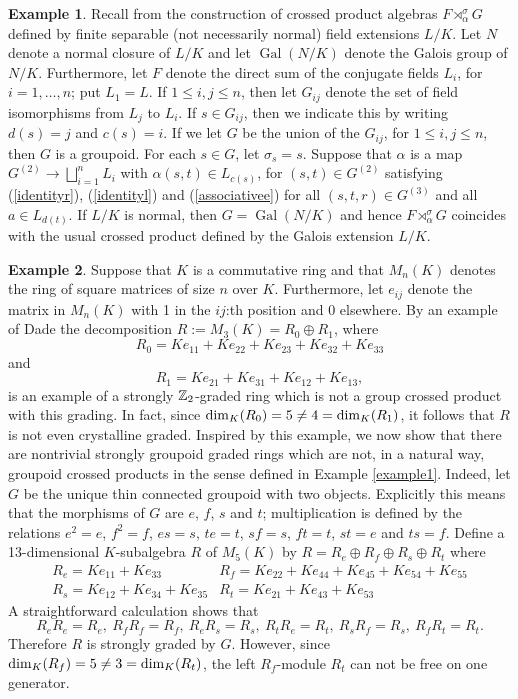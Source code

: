 \documentclass[11pt,leqno]{amsart}
\theoremstyle{plain}
\theoremstyle{definition}
\newtheorem{exmp}{Example}
\DeclareMathOperator{\Gal}{Gal}
\begin{document}
\begin{exmp}\label{example4}
Recall from \cite{lu05} the construction of
crossed product algebras $F \rtimes_{\alpha}^{\sigma} G$
defined by finite separable (not necessarily normal) field extensions $L/K$.
Let $N$ denote a normal closure of $L/K$ and
let $\Gal(N/K)$ denote the Galois group of $N/K$.
Furthermore, let $F$ denote the direct sum of the conjugate fields
$L_i$, for $i = 1, \ldots , n$; put $L_1 = L$.
If $1 \leq i,j \leq n$, then let $G_{ij}$ denote the set of
field isomorphisms from $L_j$ to $L_i$. If $s \in G_{ij}$,
then we indicate this by writing $d(s) = j$ and $c(s) = i$.
If we let $G$ be the union of the $G_{ij}$, for $1 \leq i,j \leq n$, then $G$ is a groupoid.
For each $s \in G$, let $\sigma_s = s$.
Suppose that $\alpha$ is a map
$G^{(2)} \rightarrow \bigsqcup_{i=1}^n L_i$
with $\alpha(s,t) \in L_{c(s)}$, for $(s,t) \in G^{(2)}$ satisfying
(\ref{identityr}), (\ref{identityl}) and (\ref{associativee})
for all $(s,t,r) \in G^{(3)}$ and all $a \in L_{d(t)}$.
If $L/K$ is normal, then $G = \Gal(N/K)$
and hence $F \rtimes_{\alpha}^{\sigma} G$
coincides with the usual crossed product
defined by the Galois extension $L/K$.
\end{exmp}

\begin{exmp}\label{example5}
Suppose that $K$ is a commutative ring and that $M_n(K)$
denotes the ring of square matrices of size $n$ over $K$.
Furthermore, let $e_{ij}$ denote
the matrix in $M_n(K)$ with 1 in the $ij$:th
position and 0 elsewhere.
By an example of Dade \cite{dade} the decomposition
$R := M_3(K) = R_0 \oplus R_1$, where
$$R_0 = Ke_{11} + Ke_{22} + Ke_{23} + Ke_{32} + Ke_{33}$$
and
$$R_1 =Ke_{21} + Ke_{31} + Ke_{12} + Ke_{13},$$
is an example of a strongly ${\Bbb Z}_2$-graded ring
which is not a group crossed product with this grading. In fact,
since ${\rm dim}_K(R_0) = 5 \neq 4 = {\rm dim}_K(R_1)$,
it follows that $R$ is not even crystalline graded.
Inspired by this example, we now show that there
are nontrivial strongly groupoid graded rings which are not,
in a natural way, groupoid crossed products
in the sense defined in Example \ref{example1}.
Indeed, let $G$ be the unique thin
connected groupoid with two objects.
Explicitly this means that the morphisms of $G$ are $e$, $f$,
$s$ and $t$; multiplication is defined by the relations
$e^2 = e$, $f^2 = f$, $es = s$, $te = t$,
$sf = s$, $ft = t$, $st = e$ and $ts = f$.
Define a 13-dimensional
$K$-subalgebra $R$ of $M_5(K)$ by
$R = R_e \oplus R_f \oplus R_s \oplus R_t$ where
$$
\begin{array}{ll}
R_e = Ke_{11} + Ke_{33} & R_f = Ke_{22} + Ke_{44} + Ke_{45} + Ke_{54} + Ke_{55} \\
R_s = Ke_{12} + Ke_{34} + Ke_{35} & R_t = Ke_{21} + Ke_{43} + Ke_{53}
\end{array}
$$
A straightforward calculation shows that
$$R_e R_e = R_e, \ R_f R_f = R_f, \ R_e R_s = R_s, \
R_t R_e = R_t, \ R_s R_f = R_s, \ R_f R_t = R_t.$$
Therefore $R$ is strongly graded by $G$.
However, since ${\rm dim}_K(R_f) = 5 \neq 3 = {\rm dim}_K(R_t)$, the
left $R_f$-module $R_t$ can not be free on one generator.
\end{exmp}
\end{document}

